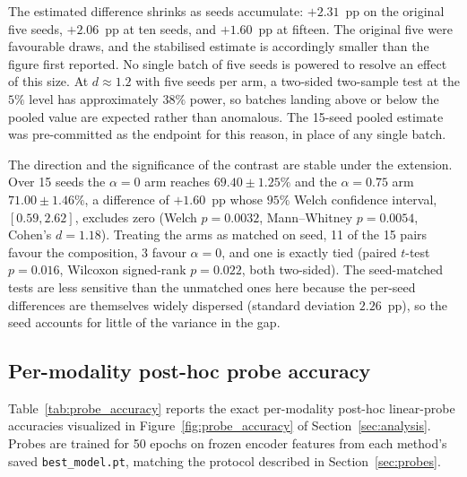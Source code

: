 \documentclass{article}
\begin{document}
The estimated difference shrinks as seeds accumulate: $+2.31$~pp on the original five seeds, $+2.06$~pp at ten seeds, and $+1.60$~pp at fifteen. The original five were favourable draws, and the stabilised estimate is accordingly smaller than the figure first reported. No single batch of five seeds is powered to resolve an effect of this size. At $d \approx 1.2$ with five seeds per arm, a two-sided two-sample test at the $5\%$ level has approximately $38\%$ power, so batches landing above or below the pooled value are expected rather than anomalous. The 15-seed pooled estimate was pre-committed as the endpoint for this reason, in place of any single batch.

The direction and the significance of the contrast are stable under the extension. Over 15 seeds the $\alpha{=}0$ arm reaches $69.40 \pm 1.25\%$ and the $\alpha{=}0.75$ arm $71.00 \pm 1.46\%$, a difference of $+1.60$~pp whose $95\%$ Welch confidence interval, $[0.59, 2.62]$, excludes zero (Welch $p = 0.0032$, Mann--Whitney $p = 0.0054$, Cohen's $d = 1.18$). Treating the arms as matched on seed, 11 of the 15 pairs favour the composition, 3 favour $\alpha{=}0$, and one is exactly tied (paired $t$-test $p = 0.016$, Wilcoxon signed-rank $p = 0.022$, both two-sided). The seed-matched tests are less sensitive than the unmatched ones here because the per-seed differences are themselves widely dispersed (standard deviation $2.26$~pp), so the seed accounts for little of the variance in the gap.

\subsection{Per-modality post-hoc probe accuracy}
\label{app:posthoc_probe_table}

Table~\ref{tab:probe_accuracy} reports the exact per-modality post-hoc linear-probe accuracies visualized in Figure~\ref{fig:probe_accuracy} of Section~\ref{sec:analysis}. Probes are trained for 50 epochs on frozen encoder features from each method's saved \texttt{best\_model.pt}, matching the protocol described in Section~\ref{sec:probes}.
\end{document}
